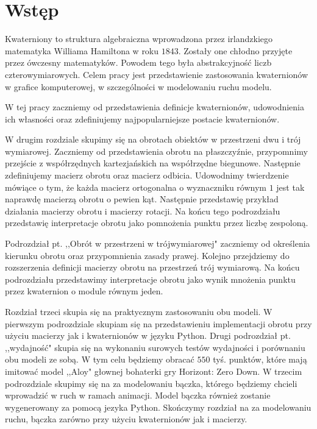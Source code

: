 \documentclass[a4paper,twoside,11pt,reqno]{mwrep}
\newcommand\blankpage{%
    \null
    \thispagestyle{empty}%
    \addtocounter{page}{-1}%
    \newpage}
\theoremstyle{plain} \newtheorem{twr}{Twierdzenie}
\theoremstyle{plain} \newtheorem{lem}{Lemat}
\theoremstyle{definition} \newtheorem{defi}{Definicja}
\theoremstyle{remark} \newtheorem*{wni}{Wniosek}
\theoremstyle{definition} \newtheorem{uwaga}{Uwaga}
\theoremstyle{definition}\newtheorem{prz}{Przykład}
\begin{document}
\tableofcontents
\clearpage
\blankpage

\chapter*{Wstęp}
Kwaterniony to struktura algebraiczna wprowadzona przez irlandzkiego matematyka Williama Hamiltona w 
roku $1843$. Zostały one chłodno przyjęte przez ówczesny matematyków. Powodem tego była
abstrakcyjność liczb czterowymiarowych. Celem pracy jest przedstawienie zastosowania kwaternionów
w grafice komputerowej, w szczególności w modelowaniu ruchu modelu.  

W tej pracy zaczniemy od przedstawienia definicje kwaternionów, udowodnienia ich własności 
oraz zdefiniujemy najpopularniejsze postacie kwaternionów.

W drugim rozdziale skupimy się na obrotach obiektów w przestrzeni dwu i trój wymiarowej.
Zaczniemy od przedstawienia obrotu na płaszczyźnie, przypomnimy przejście z współrzędnych 
kartezjańskich na współrzędne biegunowe. Następnie zdefiniujemy macierz obrotu
oraz macierz odbicia. Udowodnimy twierdzenie mówiące o tym, że każda macierz 
ortogonalna o wyznaczniku równym $1$ jest tak naprawdę macierzą obrotu o pewien kąt.
Następnie przedstawię przykład działania macierzy obrotu i macierzy rotacji.
Na końcu tego podrozdziału przedstawię interpretacje obrotu jako pomnożenia punktu przez
liczbę zespoloną.

Podrozdział pt. ,,Obrót w przestrzeni w trójwymiarowej" zaczniemy od określenia kierunku obrotu
oraz przypomnienia zasady prawej. Kolejno przejdziemy do rozszerzenia definicji macierzy obrotu
na przestrzeń trój wymiarową. Na końcu podrozdziału przedstawimy interpretacje obrotu 
jako wynik mnożenia punktu przez kwaternion o module równym jeden.

Rozdział trzeci skupia się na praktycznym zastosowaniu obu modeli.
W pierwszym podrozdziale skupiam się na przedstawieniu implementacji 
obrotu przy użyciu macierzy jak i kwaternionów w języku Python.
Drugi podrozdział pt. ,,wydajność" skupia się na wykonaniu surowych testów wydajności i
porównaniu obu modeli ze sobą. W tym celu będziemy obracać $550$ tyś. punktów, które mają
imitować model ,,Aloy" głownej bohaterki gry Horizont: Zero Down.
W trzecim podrozdziale skupimy się na za modelowaniu bączka, 
którego będziemy chcieli wprowadzić w ruch w ramach animacji. Model bączka również zostanie
wygenerowany za pomocą jezyka Python. 
Skończymy rozdział na za modelowaniu ruchu, bączka zarówno przy użyciu kwaternionów jak 
i macierzy.
             
\end{document}
